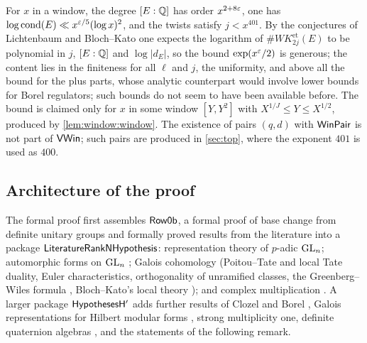 \begin{remark}\label{rem:window:statement}
For $x$ in a window, the degree $[E:\mathbb{Q}]$ has order $x^{2+8\varepsilon}$, one has $\log\operatorname{cond}(E)\ll x^{\varepsilon/5}(\log x)^2$,
and the twists satisfy $j<x^{401}$. By the conjectures of Lichtenbaum and Bloch--Kato one expects the logarithm of
$\#WK^{\mathrm{et}}_{2j}(E)$ to be polynomial in $j$,
$[E:\mathbb{Q}]$ and $\log|d_E|$, so the bound $\exp(x^\varepsilon/2)$ is generous; the content lies in the finiteness for all $\ell$
and $j$, the uniformity, and above all the bound for the plus parts, whose analytic counterpart would involve lower
bounds for Borel regulators; such bounds do not seem to have been available before. The bound is claimed only for
$x$ in some window $[Y,Y^2]$ with $X^{1/J}\le Y\le X^{1/2}$, produced by \cref{lem:window:window}. The existence of
pairs $(q,d)$ with $\mathsf{WinPair}$ is not part of $\mathsf{VWin}$; such pairs are produced in \cref{sec:top},
where the exponent $401$ is used as $400$.
\end{remark}

\subsection{Architecture of the proof}\label{sec:window:arch}

The formal proof first assembles $\mathsf{Row0b}$, a formal proof of base change from definite unitary groups and
formally proved results from the literature into a package $\mathsf{LiteratureRankNHypothesis}$: representation
theory of $p$-adic $\operatorname{GL}_n$; automorphic forms on $\operatorname{GL}_n$ \cite{JacquetShalika1976,JacquetShalika1981,Clozel1990};
Galois cohomology (Poitou--Tate and local Tate duality, Euler characteristics, orthogonality of unramified classes,
the Greenberg--Wiles formula \cite{Wiles1995}, Bloch--Kato's local theory \cite{BlochKato1990}); and complex
multiplication \cite{Shimura1971,DeligneRibet1980}. A larger package $\mathsf{HypothesesH'}$ adds further results of
Clozel \cite{Clozel1990} and Borel \cite{Borel1983}, Galois representations for Hilbert modular forms
\cite{Carayol1986,Taylor1989}, strong multiplicity one, definite quaternion algebras \cite{Vigneras1980}, and the
statements of the following remark.

